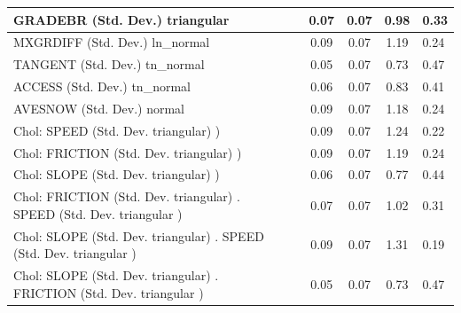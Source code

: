 \begin{table}
\begin{center}
\begin{tabular}{|l|l|c|c|c|l|}
			\hline
			GRADEBR (Std. Dev.) triangular &  & 0.07 & 0.07 & 0.98 & 0.33 \\
			\hline
			MXGRDIFF (Std. Dev.) ln_normal &  & 0.09 & 0.07 & 1.19 & 0.24 \\
			\hline
			TANGENT (Std. Dev.) tn_normal &  & 0.05 & 0.07 & 0.73 & 0.47 \\
			\hline
			ACCESS (Std. Dev.) tn_normal &  & 0.06 & 0.07 & 0.83 & 0.41 \\
			\hline
			AVESNOW (Std. Dev.) normal &  & 0.09 & 0.07 & 1.18 & 0.24 \\
			\hline
			 Chol: SPEED (Std. Dev. triangular) ) &  & 0.09 & 0.07 & 1.24 & 0.22 \\
			\hline
			 Chol: FRICTION (Std. Dev. triangular) ) &  & 0.09 & 0.07 & 1.19 & 0.24 \\
			\hline
			 Chol: SLOPE (Std. Dev. triangular) ) &  & 0.06 & 0.07 & 0.77 & 0.44 \\
			\hline
			 Chol: FRICTION (Std. Dev. triangular) . SPEED (Std. Dev.   triangular ) &  & 0.07 & 0.07 & 1.02 & 0.31 \\
			\hline
			 Chol: SLOPE (Std. Dev. triangular) . SPEED (Std. Dev.   triangular ) &  & 0.09 & 0.07 & 1.31 & 0.19 \\
			\hline
			 Chol: SLOPE (Std. Dev. triangular) . FRICTION (Std. Dev.   triangular ) &  & 0.05 & 0.07 & 0.73 & 0.47 \\
			\hline
		\end{tabular}
	\end{center}
\end{table}